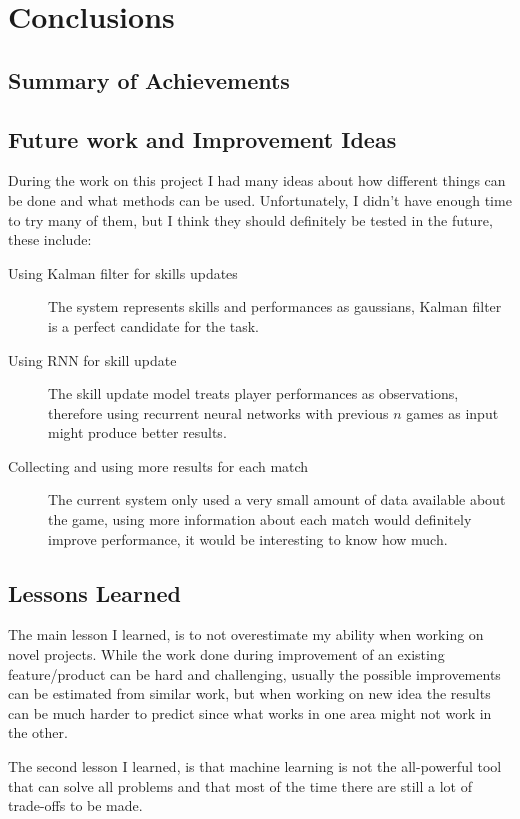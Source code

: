 \documentclass[12pt,a4paper]{book}
\begin{document}
\chapter{Conclusions}
\section{Summary of Achievements}

\section{Future work and Improvement Ideas}
During the work on this project I had many ideas about how different things can be done and what methods can be used.
Unfortunately, I didn't have enough time to try many of them, but I think they should definitely be tested in the future, these include:
\begin{description}
\item[Using Kalman filter for skills updates]
The system represents skills and performances as gaussians, Kalman filter is a perfect candidate for the task.

\item[Using RNN for skill update]
The skill update model treats player performances as observations, therefore using recurrent neural networks with previous $n$ games as input might produce better results.

\item[Collecting and using more results for each match]
The current system only used a very small amount of data available about the game, using more information about each match would definitely improve performance, it would be interesting to know how much.
\end{description}
\section{Lessons Learned}
The main lesson I learned, is to not overestimate my ability when working on novel projects.
While the work done during improvement of an existing feature/product can be hard and challenging, usually the possible improvements can be estimated from similar work, but when working on new idea the results can be much harder to predict since what works in one area might not work in the other.

The second lesson I learned, is that machine learning is not the all-powerful tool that can solve all problems and that most of the time there are still a lot of trade-offs to be made.
\end{document}
